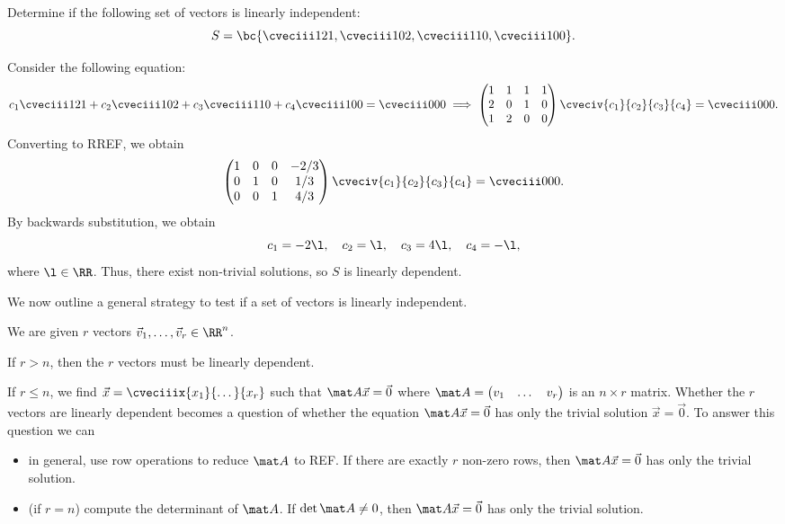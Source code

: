 \begin{sample}
    Determine if the following set of vectors is linearly independent: \[S = \bc{\cveciii121, \cveciii102, \cveciii110, \cveciii100}.\]
\end{sample}
\begin{sampans}
    Consider the following equation: \[c_1 \cveciii121 + c_2 \cveciii102 + c_3 \cveciii110 + c_4 \cveciii100 = \cveciii000 \implies \begin{pmatrix}1 & 1 & 1 & 1 \\ 2 & 0 & 1 & 0 \\ 1 & 2 & 0 & 0\end{pmatrix} \cveciv{c_1}{c_2}{c_3}{c_4} = \cveciii000.\] Converting to RREF, we obtain \[\begin{pmatrix}1 & 0 & 0 & -2/3 \\ 0 & 1 & 0 & 1/3 \\ 0 & 0 & 1 & 4/3\end{pmatrix} \cveciv{c_1}{c_2}{c_3}{c_4} = \cveciii000.\] By backwards substitution, we obtain \[c_1 = -2\l, \quad c_2 = \l, \quad c_3 = 4\l, \quad c_4 = -\l,\] where $\l \in \RR$. Thus, there exist non-trivial solutions, so $S$ is linearly dependent.
\end{sampans}

We now outline a general strategy to test if a set of vectors is linearly independent.

\begin{recipe}
    We are given $r$ vectors $\vec v_1, \dots, \vec v_r \in \RR^n$.

     If $r > n$, then the $r$ vectors must be linearly dependent.
    
     If $r \leq n$, we find $\vec x = \cveciiix{x_1}{\dots}{x_r}$ such that $\mat A \vec x = \vec 0$ where $\mat A = \begin{pmatrix}v_1 & \dots & v_r\end{pmatrix}$ is an $n \times r$ matrix. Whether the $r$ vectors are linearly dependent becomes a question of whether the equation $\mat A \vec x = \vec 0$ has only the trivial solution $\vec x = \vec 0$. To answer this question we can
    \begin{itemize}
        \item in general, use row operations to reduce $\mat A$ to REF. If there are exactly $r$ non-zero rows, then $\mat A \vec x = \vec 0$ has only the trivial solution.
        \item (if $r = n$) compute the determinant of $\mat A$. If $\det \mat A \neq 0$, then $\mat A \vec x = \vec 0$ has only the trivial solution.
    \end{itemize}
\end{recipe}

